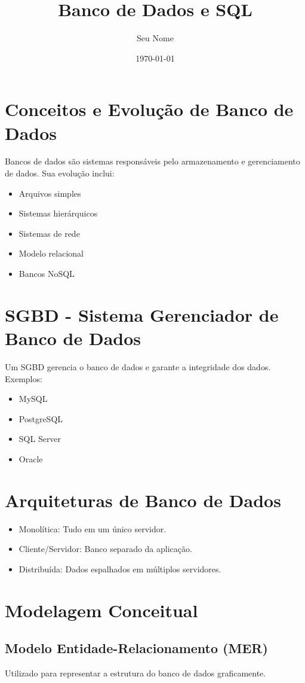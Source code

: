 \documentclass{article}
\title{Banco de Dados e SQL}
\author{Seu Nome}
\date{\today}
\begin{document}
\maketitle

\section{Conceitos e Evolução de Banco de Dados}
Bancos de dados são sistemas responsáveis pelo armazenamento e gerenciamento de dados. Sua evolução inclui:
\begin{itemize}
    \item Arquivos simples
    \item Sistemas hierárquicos
    \item Sistemas de rede
    \item Modelo relacional
    \item Bancos NoSQL
\end{itemize}

\section{SGBD - Sistema Gerenciador de Banco de Dados}
Um SGBD gerencia o banco de dados e garante a integridade dos dados. Exemplos:
\begin{itemize}
    \item MySQL
    \item PostgreSQL
    \item SQL Server
    \item Oracle
\end{itemize}

\section{Arquiteturas de Banco de Dados}
\begin{itemize}
    \item Monolítica: Tudo em um único servidor.
    \item Cliente/Servidor: Banco separado da aplicação.
    \item Distribuída: Dados espalhados em múltiplos servidores.
\end{itemize}

\section{Modelagem Conceitual}
\subsection{Modelo Entidade-Relacionamento (MER)}
Utilizado para representar a estrutura do banco de dados graficamente.
\end{document}
